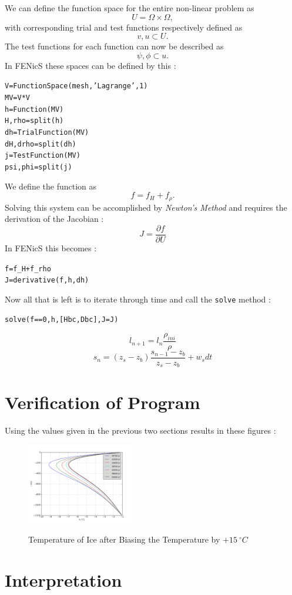 \documentclass{article}%
\begin{document}
We can define the function space for the entire non-linear problem as 
  $$
    U = \Omega \times \Omega,
  $$
with corresponding trial and test functions respectively defined as
  $$
    v, u \subset U.
  $$
The test functions for each function can now be described as
  $$
    \psi, \phi \subset u.
  $$
In FENicS these spaces can be defined by this :
\small
\begin{alltt}
V         = FunctionSpace(mesh, 'Lagrange', 1)
MV        = V*V
h         = Function(MV)
H,rho     = split(h)    
dh        = TrialFunction(MV)
dH, drho  = split(dh)
j         = TestFunction(MV)
psi, phi  = split(j)
\end{alltt}
\normalsize

We define the function as 
  $$
    f = f_H + f_{\rho}.
  $$
Solving this system can be accomplished by \emph{Newton's Method} and requires the derivation of the Jacobian :
  $$
    J = \frac{\partial f}{\partial U}
  $$
In FENicS this becomes :
\small
\begin{alltt}
f  = f_H + f_rho
J  = derivative(f, h, dh)
\end{alltt}
\normalsize

Now all that is left is to iterate through time and call the \texttt{solve} method :
\small
\begin{alltt}
solve(f == 0, h, [Hbc, Dbc], J=J)
\end{alltt}
\normalsize

  $$l_{n+1} = l_n \frac{\rho_{ini}}{\rho}$$
  $$s_{n} = (z_s - z_b) \frac{s_{n-1} - z_b}{z_{s} - z_b} + w_s dt $$


\section{Verification of Program}
Using the values given in the previous two sections results in these figures :
\begin{figure}[H]
	\centering
		\includegraphics[width=0.42\textwidth]{images/60000yr_converge.png}
	\label{fig:500 year orbit}
	\caption{Temperature of Ice after Biasing the Temperature by $+15\ ^\circ C$}
\end{figure}


\section{Interpretation}
\end{document}
